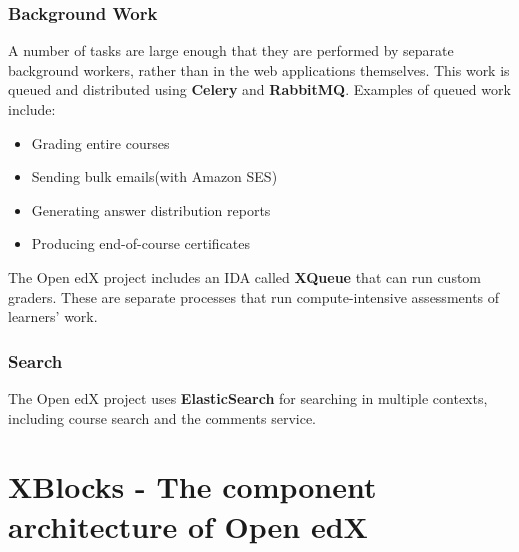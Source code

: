 \subsection{Background Work}
A number of tasks are large enough that they are performed by separate background workers, rather
than in the web applications themselves. This work is queued and distributed using \textbf{Celery} and
\textbf{RabbitMQ}. Examples of queued work include:\newline
\begin{itemize}
	\item Grading entire courses
	\item Sending bulk emails(with Amazon SES)
	\item Generating answer distribution reports
	\item Producing end-of-course certificates
\end{itemize}
The Open edX project includes an IDA called \textbf{XQueue} that can run custom graders. These are
separate processes that run compute-intensive assessments of learners’ work.

\subsection{Search}
The Open edX project uses \textbf{ElasticSearch} for searching in multiple contexts, including course
search and the comments service.


\chapter{XBlocks - The component architecture of Open edX}

